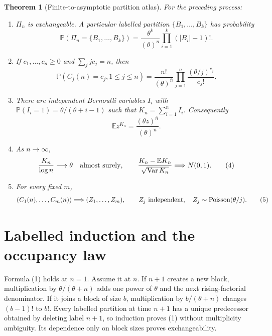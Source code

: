 \documentclass[10pt]{article}
\newtheorem{theorem}{Theorem}
\theoremstyle{remark}
\newcommand{\rising}[2]{(#1)^{\overline{#2}}}
\begin{document}
\begin{theorem}[Finite-to-asymptotic partition atlas]\label{thm:main}
For the preceding process:
\begin{enumerate}[label=\textup{(\roman*)}]
\item $\Pi_n$ is exchangeable.  A particular labelled partition
$\{B_1,\ldots,B_k\}$ has probability
\begin{equation}
 \mathbb P(\Pi_n=\{B_1,\ldots,B_k\})
 =\frac{\theta^k}{\rising{\theta}{n}}
   \prod_{i=1}^k(|B_i|-1)!.                              \tag{1}
\end{equation}
\item If $c_1,\ldots,c_n\geq0$ and $\sum_j j c_j=n$, then
\begin{equation}
 \mathbb P(C_j(n)=c_j,1\leq j\leq n)
 =\frac{n!}{\rising{\theta}{n}}
   \prod_{j=1}^n\frac{(\theta/j)^{c_j}}{c_j!}.            \tag{2}
\end{equation}
\item There are independent Bernoulli variables $I_i$ with
$\mathbb P(I_i=1)=\theta/(\theta+i-1)$ such that
$K_n=\sum_{i=1}^nI_i$.  Consequently
\begin{equation}
 \mathbb E z^{K_n}=\frac{\rising{\theta z}{n}}
                          {\rising{\theta}{n}}.            \tag{3}
\end{equation}
\item As $n\to\infty$,
\[
 \frac{K_n}{\log n}\longrightarrow\theta\quad\hbox{almost surely},
 \qquad
 \frac{K_n-\mathbb EK_n}{\sqrt{\operatorname{Var}K_n}}
 \Longrightarrow N(0,1).                                \tag{4}
\]
\item For every fixed $m$,
\begin{equation}
 (C_1(n),\ldots,C_m(n))\Longrightarrow(Z_1,\ldots,Z_m),
 \qquad Z_j\ \hbox{independent},\quad Z_j\sim
 \operatorname{Poisson}(\theta/j).                       \tag{5}
\end{equation}
\end{enumerate}
\end{theorem}

\section{Labelled induction and the occupancy law}

Formula (1) holds at $n=1$.  Assume it at $n$.  If $n+1$ creates a new
block, multiplication by $\theta/(\theta+n)$ adds one power of $\theta$
and the next rising-factorial denominator.  If it joins a block of size
$b$, multiplication by $b/(\theta+n)$ changes $(b-1)!$ to $b!$.
Every labelled partition at time $n+1$ has a unique predecessor obtained
by deleting label $n+1$, so induction proves (1) without multiplicity
ambiguity.  Its dependence only on block sizes proves exchangeability.
\end{document}
